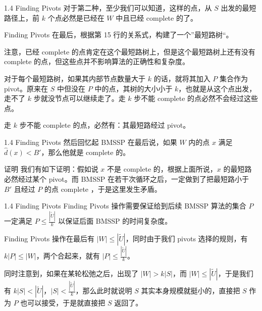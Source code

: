 \documentclass{beamer}
\begin{document}
\begin{frame}{1.4 Finding Pivots}
  对于第二种，至少我们可以知道，这样的点，从 $S$ 出发的最短路径上，前 $k$ 个点必然是已经在 $W$ 中且已经 complete 的了。

  \vspace{0.35em}\pause
  Finding Pivots 在最后，根据第 15 行的关系式，构建了一个”最短路树“。

  注意，已经 complete 的点肯定在这个最短路树上，但是这个最短路树上还有没有 complete 的点，但这些点并不影响算法的正确性和复杂度。

  \vspace{0.35em}\pause
  对于每个最短路树，如果其内部节点数量大于 $k$ 的话，就将其加入 $P$ 集合作为 pivot。原来在 $S$ 中但没在 $P$ 中的点，其树的大小小于 $k$，也就是从这个点出发，走不了 $k$ 步就没节点可以继续走了。走 $k$ 步不能 complete 的点必然不会经过这些点。

  \vspace{0.35em}\pause
  走 $k$ 步不能 complete 的点，必然有：其最短路经过 pivot。
\end{frame}

\begin{frame}{1.4 Finding Pivots}
  然后回忆起 BMSSP 在最后说，如果 $W$ 内的点 $x$ 满足 $\hat{d}(x) < B'$，那么他就是 complete 的。
  
  \pause

  \begin{block}{证明}
  我们有如下证明：假如说 $x$ 不是 complete 的，根据上面所说，$x$ 的最短路必然经过某个 pivot。而 BMSSP 在若干次循环之后，一定做到了把最短路小于 $B'$ 且经过 $P$ 的点 complete ，于是这里发生矛盾。
  \end{block}
\end{frame}

\begin{frame}{1.4 Finding Pivots}
  Finding Pivots 操作需要保证给到后续 BMSSP 算法的集合 $P$ 一定满足 $P\le \frac{|\widetilde{U}|}{k}$ 以保证后面 BMSSP 的时间复杂度。

  \pause

  Finding Pivots 操作在最后有 $|W| \le |\widetilde{U} |$，同时由于我们 pivots 选择的规则，有 $k|P|\le |W|$，两个合起来，就有 $|P|\le \frac{|\widetilde{U} |}{k}$。

  \pause\vspace{0.35em}
  同时注意到，如果在某轮松弛之后，出现了 $|W|>k|S|$，而 $|W|\le  |\widetilde{U} |$，于是我们有 $k|S| < |\widetilde{U}|$，$|S|<\frac{|\widetilde{U} |}{k}$，那么此时就说明 $S$ 其实本身规模就挺小的，直接把 $S$ 作为 $P$ 也可以接受，于是就直接把 $S$ 返回了。
\end{frame}
\end{document}
